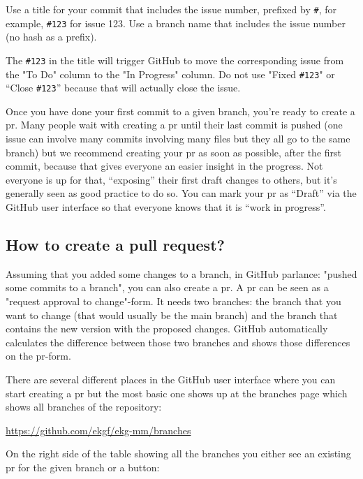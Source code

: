 Use a title for your commit that includes the issue number, 
prefixed by \texttt{\#}, for example, \texttt{\#123} for issue 123.
Use a branch name that includes the issue number (no hash as a prefix).

The \texttt{\#123} in the title will trigger GitHub to move the
corresponding issue from the "To Do" column to the "In Progress" column.
Do not use "Fixed \texttt{\#123}" or “Close \texttt{\#123}” because that 
will actually close the issue.

Once you have done your first commit to a given branch, you’re ready to
create a \gls{pr}. 
Many people wait with creating a \gls{pr} until their last commit is pushed
(one issue can involve many commits involving many files but they all 
go to the same branch) but we recommend creating your \gls{pr} as soon as possible, 
after the first commit, because that gives everyone an easier insight 
in the progress. Not everyone is up for that, “exposing” their 
first draft changes to others, but it’s generally seen as 
good practice to do so. 
You can mark your \gls{pr} as “Draft” via the GitHub user interface so that 
everyone knows that it is “work in progress”.

\subsection{How to create a pull request?}
\label{subsec:ekg-mm-process-how-to-create-a-pull-request}

Assuming that you added some changes to a branch, in GitHub parlance: 
"pushed some commits to a branch", you can also create a \gls{pr}. 
A \gls{pr} can be seen as a "request approval to change"-form. 
It needs two branches: the branch that you want to change (that would 
usually be the main branch) and the branch that contains the new version 
with the proposed changes. 
GitHub automatically calculates the difference between those two branches
and shows those differences on the \gls{pr}-form.

There are several different places in the GitHub user interface where you 
can start creating a \gls{pr} but the most basic one shows up at the branches 
page which shows all branches of the repository:

\begin{center}
    \url{https://github.com/ekgf/ekg-mm/branches}
\end{center}

On the right side of the table showing all the branches you either see an 
existing \gls{pr} for the given branch or a button:

